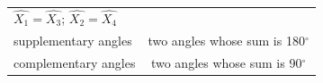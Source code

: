 {\begin{tabular}[t]{|l|l|l|}
        
                  \begin{math}\hat{{X}_{1}}=\hat{{X}_{3}}\end{math};
                  \begin{math}\hat{{X}_{2}}=\hat{{X}_{4}}\end{math}
     \tabularnewline\cline{1-1}\cline{2-2}\cline{3-3}
    
    
        supplementary angles &
    \multicolumn{2}{c|}{two angles whose sum is 180\begin{math}{}^{\circ }\end{math}}
     \tabularnewline\cline{1-1}\cline{2-2}\cline{3-3}
    
    
        complementary angles &
    \multicolumn{2}{c|}{two angles whose sum is 90\begin{math}{}^{\circ }\end{math}}
     \tabularnewline\cline{1-1}\cline{2-2}\cline{3-3}
    \end{tabular}} %
        \addtolength{\mytableboxheight}{\mytableboxdepth}
        \addtocounter{footnote}{-0}
        
